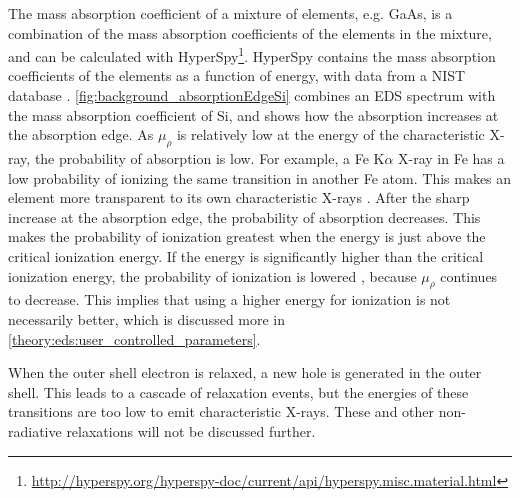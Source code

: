 The mass absorption coefficient of a mixture of elements, e.g. GaAs, is a combination of the mass absorption coefficients of the elements in the mixture, and can be calculated with HyperSpy\footnote{\url{http://hyperspy.org/hyperspy-doc/current/api/hyperspy.misc.material.html}}.
HyperSpy contains the mass absorption coefficients of the elements as a function of energy, with data from a NIST database \cite{nist_xraydatabase_hyperspy}.
\cref{fig:background_absorptionEdgeSi} combines an EDS spectrum with the mass absorption coefficient of Si, and shows how the absorption increases at the absorption edge.
As $\mu_\rho$ is relatively low at the energy of the characteristic X-ray, the probability of absorption is low.
For example, a Fe K$\alpha$ X-ray in Fe has a low probability of ionizing the same transition in another Fe atom.
This makes an element more transparent to its own characteristic X-rays \cite[Ch. 4.4]{goldstein_scanning_2018}.
After the sharp increase at the absorption edge, the probability of absorption decreases.
This makes the probability of ionization greatest when the energy is just above the critical ionization energy.
If the energy is significantly higher than the critical ionization energy, the probability of ionization is lowered \cite[p. 78]{curry_radiology_k_absorption}, because $\mu_\rho$ continues to decrease.
This implies that using a higher energy for ionization is not necessarily better, which is discussed more in \cref{theory:eds:user_controlled_parameters}.


When the outer shell electron is relaxed, a new hole is generated in the outer shell.
This leads to a cascade of relaxation events, but the energies of these transitions are too low to emit characteristic X-rays.
These and other non-radiative relaxations will not be discussed further.


